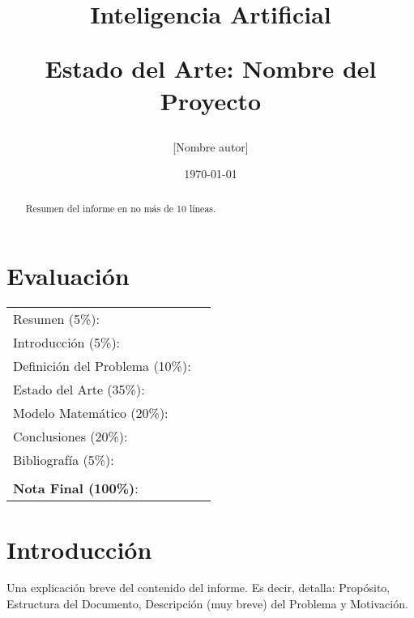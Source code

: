 \documentclass[letter, 10pt]{article}
\begin{document}
\title{Inteligencia Artificial \\ \begin{Large}Estado del Arte: Nombre del Proyecto\end{Large}}
\author{[Nombre autor]}
\date{\today}
\maketitle


\section*{Evaluaci\'on}

\begin{tabular}{ll}
Resumen (5\%): & \underline{\hspace{2cm}} \\
Introducci\'on (5\%):  & \underline{\hspace{2cm}} \\
Definici\'on del Problema (10\%):  & \underline{\hspace{2cm}} \\
Estado del Arte (35\%):  & \underline{\hspace{2cm}} \\
Modelo Matem\'atico (20\%): &  \underline{\hspace{2cm}}\\
Conclusiones (20\%): &  \underline{\hspace{2cm}}\\
Bibliograf\'ia (5\%): & \underline{\hspace{2cm}}\\
 &  \\
\textbf{Nota Final (100\%)}:   & \underline{\hspace{2cm}}
\end{tabular}
\vspace{2cm}


\begin{abstract}
Resumen del informe en no m\'as de 10 l\'ineas.
\end{abstract}

\section{Introducci\'on}
Una explicaci\'on breve del contenido del informe. Es decir, detalla: Prop\'osito, Estructura del Documento, Descripci\'on (muy breve) del Problema y Motivaci\'on.
\end{document}
